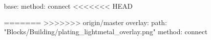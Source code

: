 base:
  method: connect
<<<<<<< HEAD

=======
>>>>>>> origin/master
overlay:
  path: "Blocks/Building/plating_lightmetal_overlay.png"
  method: connect